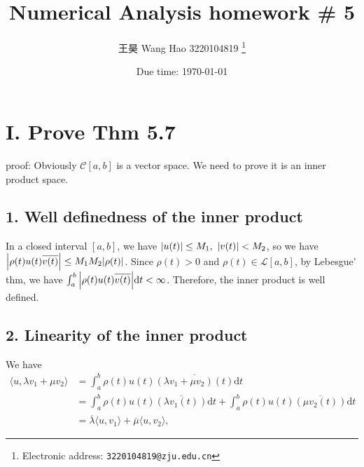 \documentclass[a4paper]{article}
\begin{document}
\title{Numerical Analysis homework \# 5}

\author{王昊 Wang Hao 3220104819
  \thanks{Electronic address: \texttt{3220104819@zju.edu.cn}}}


\date{Due time: \today}

\maketitle

\section*{I. Prove Thm 5.7}

proof: Obviously $\mathcal{C} [a,b]$ is a vector space. We need to prove it is an inner product space.

\subsection*{1. Well definedness of the inner product}

In a closed interval $[a,b]$, we have $\abs{u(t)} \leq M_1, ~ \abs{v(t)} < M_2$, so we have $\abs{\rho(t) u(t) \overline{v(t)}} \leq M_1 M_2 \abs{\rho(t)}$. Since $\rho(t)>0$ and $\rho(t) \in \mathcal{L}[a,b]$, by Lebesgue' thm, we have $\int_a^b \abs{\rho(t) u(t) \overline{v(t)}} \mathrm{d}t < \infty$. Therefore, the inner product is well defined.

\subsection*{2. Linearity of the inner product}

We have
\begin{equation}
    \begin{aligned}
        \langle u, \lambda v_1 + \mu v_2 \rangle &= \int_a^b \rho (t) u(t) \overline{(\lambda v_1 + \mu v_2)(t)} \mathrm{d}t \\
        &= \int_a^b \rho (t) u(t) \overline{(\lambda v_1(t))} \mathrm{d} t + \int_a^b \rho (t) u(t) \overline{(\mu v_2(t))} \mathrm{d} t \\
        &= \overline{\lambda} \langle u, v_1 \rangle + \overline{\mu} \langle u, v_2 \rangle,
    \end{aligned}
\end{equation}
\end{document}
